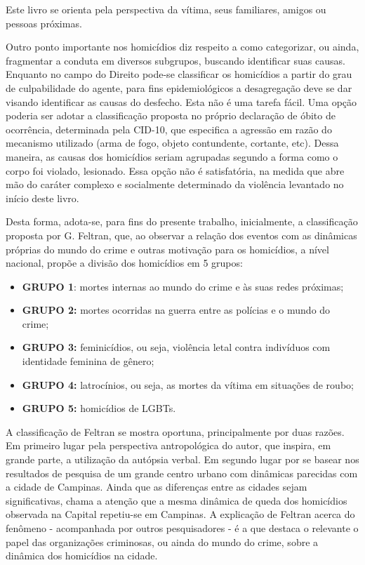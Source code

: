 Este livro se orienta pela perspectiva da vítima, seus familiares, amigos ou pessoas próximas.

Outro ponto importante nos homicídios diz respeito a como categorizar, ou ainda, fragmentar a conduta em diversos subgrupos, buscando identificar suas causas. Enquanto no campo do Direito pode-se classificar os homicídios a partir do grau de culpabilidade do agente, para fins epidemiológicos a desagregação deve se dar visando identificar as causas do desfecho. Esta não é uma tarefa fácil. Uma opção poderia ser adotar a classificação proposta no próprio declaração de óbito de ocorrência, determinada pela CID-10, que especifica a agressão em razão do mecanismo utilizado (arma de fogo, objeto contundente, cortante, etc). Dessa maneira, as causas dos homicídios seriam agrupadas segundo a forma como o corpo foi violado, lesionado. Essa opção não é satisfatória, na medida que abre mão do caráter complexo e socialmente determinado da violência levantado no início deste livro.

Desta forma, adota-se, para fins do presente trabalho, inicialmente, a classificação proposta por G. Feltran, que, ao observar a relação dos eventos com as dinâmicas próprias do mundo do crime e outras motivação para os homicídios, a nível nacional, propõe a divisão dos homicídios em 5 grupos\citep{ABSP2019}:

\begin{itemize}
    \item \textbf{GRUPO 1}: mortes internas ao mundo do crime e às suas redes próximas;
    \item \textbf{GRUPO 2:} mortes ocorridas na guerra entre as polícias e o mundo do crime;
    \item \textbf{GRUPO 3:} feminicídios, ou seja, violência letal contra indivíduos com identidade feminina de gênero;
    \item \textbf{GRUPO 4:} latrocínios, ou seja, as mortes da vítima em situações de roubo;
    \item \textbf{GRUPO 5:} homicídios de LGBTs. 
\end{itemize}

A classificação de Feltran se mostra oportuna, principalmente por duas razões. Em primeiro lugar pela perspectiva antropológica do autor, que inspira, em grande parte, a utilização da autópsia verbal. Em segundo lugar por se basear nos resultados de pesquisa de um grande centro urbano com dinâmicas parecidas com a cidade de Campinas. Ainda que as diferenças entre as cidades sejam significativas, chama a atenção que a mesma dinâmica de queda dos homicídios observada na Capital repetiu-se em Campinas. A explicação de Feltran acerca do fenômeno - acompanhada por outros pesquisadores - é a que destaca o relevante o papel das organizações criminosas, ou ainda do mundo do crime, sobre a dinâmica dos homicídios na cidade.

